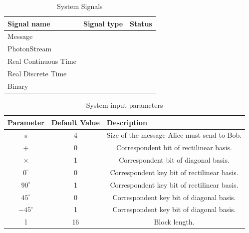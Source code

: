 \begin{table}[hbt]
\centering
\caption{System Signals}
\label{my-label}
\begin{tabular}{|l|l|l|}
\hline
\textbf{Signal name} & \textbf{Signal type} & \textbf{Status} \\ \hline
Message              &                      &                 \\ \hline
PhotonStream         &                      &                 \\ \hline
Real Continuous Time &                      &                 \\ \hline
Real Discrete Time   &                      &                 \\ \hline
Binary               &                      &                 \\ \hline
\end{tabular}
\end{table}

\begin{table}[hbt]
\centering
\caption{System input parameters}
\label{my-label}
\begin{tabular}{|c|c|c|}
\hline
\multicolumn{1}{|l|}{\textbf{Parameter}} & \multicolumn{1}{l|}{\textbf{Default Value}} & \multicolumn{1}{l|}{\textbf{Description}}                     \\ \hline
s                                        & 4                                           & Size of the message Alice must send to Bob.                   \\ \hline
+                                        & 0                                           & Correspondent bit of rectilinear basis.                       \\ \hline
$\times$                                 & 1                                           & Correspondent bit of diagonal basis.                          \\ \hline
$0^{\circ}$                              & 0                                           & Correspondent key bit of rectilinear basis.                   \\ \hline
$90^{\circ}$                             & 1                                           & Correspondent key bit of rectilinear basis.                   \\ \hline
$45^{\circ}$                             & 0                                           & Correspondent key bit of diagonal basis. \\ \hline
$-45^{\circ}$                            & 1                                           & Correspondent key bit of diagonal basis. \\ \hline
l                                        & 16                                          & Block length.                                                  \\ \hline
\end{tabular}
\end{table}


